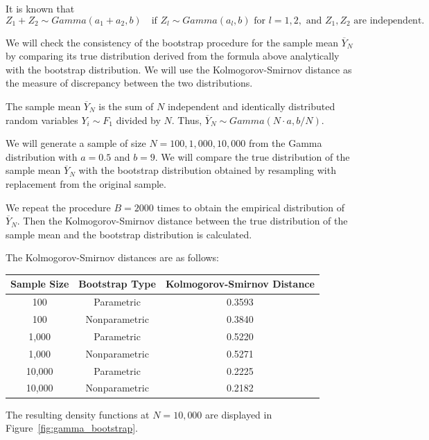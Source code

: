 \documentclass{article}
\begin{document}
It is known that
\[
Z_1 + Z_2 \sim Gamma(a_1 + a_2, b) \quad \text{if } Z_l \sim Gamma(a_l, b) \text{ for } l = 1, 2, \text{ and } Z_1, Z_2 \text{ are independent}.
\]

We will check the consistency of the bootstrap procedure for the sample mean \(\overline{Y}_N\) by comparing its true distribution derived from the formula above analytically with the bootstrap distribution. We will use the Kolmogorov-Smirnov distance as the measure of discrepancy between the two distributions.

The sample mean \(\overline{Y}_N\) is the sum of \(N\) independent and identically distributed random variables \(Y_i \sim F_1\) divided by \(N\). Thus, \(\overline{Y}_N \sim Gamma(N \cdot a, b / N)\).

We will generate a sample of size \(N = 100, 1,000, 10,000\) from the Gamma distribution with \(a = 0.5\) and \(b = 9\). We will compare the true distribution of the sample mean \(\overline{Y}_N\) with the bootstrap distribution obtained by resampling with replacement from the original sample.

We repeat the procedure \(B = 2000\) times to obtain the empirical distribution of \(\overline{Y}_N\). Then the Kolmogorov-Smirnov distance between the true distribution of the sample mean and the bootstrap distribution is calculated.

The Kolmogorov-Smirnov distances are as follows:

\begin{table}[h]
\centering
\begin{tabular}{|c|c|c|}
\hline
\textbf{Sample Size} & \textbf{Bootstrap Type} & \textbf{Kolmogorov-Smirnov Distance} \\ \hline
100 & Parametric & 0.3593 \\ \hline
100 & Nonparametric & 0.3840 \\ \hline
1,000 & Parametric & 0.5220 \\ \hline
1,000 & Nonparametric & 0.5271 \\ \hline
10,000 & Parametric & 0.2225 \\ \hline
10,000 & Nonparametric & 0.2182 \\ \hline
\end{tabular}
\end{table}

The resulting density functions at \(N = 10,000\) are displayed in Figure~\ref{fig:gamma_bootstrap}.
\end{document}
